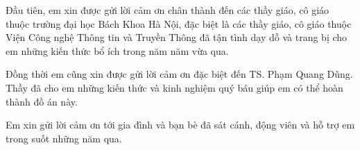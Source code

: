 
\begin{acknowledgements}
Đầu tiên, em xin được gửi lời cảm ơn chân thành đến các thầy giáo,
cô giáo thuộc trường đại học Bách Khoa Hà Nội, đặc biệt là các thầy
giáo, cô giáo thuộc Viện Công nghệ Thông tin và Truyền Thông đã tận
tình dạy dỗ và trang bị cho em những kiến thức bổ ích trong năm năm vừa qua.

Đồng thời em cũng xin được gửi lời cảm ơn đặc biệt đến TS. Phạm Quang Dũng.
Thầy đã cho em những kiến thức và kinh nghiệm quý báu giúp em có
thể hoàn thành đồ án này.

Em xin gửi lời cảm ơn tới gia đình và bạn bè đã sát cánh,
động viên và hỗ trợ em trong suốt những năm qua. 
\end{acknowledgements}
